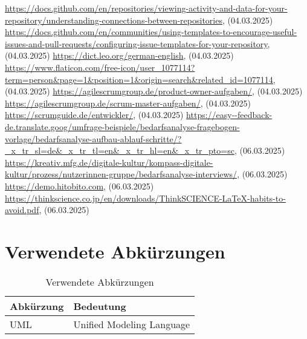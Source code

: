 \renewcommand\bibname{Quellenverzeichnis}
\begin{thebibliography}{9}
     \url{https://docs.github.com/en/repositories/viewing-activity-and-data-for-your-repository/understanding-connections-between-repositories}, (04.03.2025)
     \url{https://docs.github.com/en/communities/using-templates-to-encourage-useful-issues-and-pull-requests/configuring-issue-templates-for-your-repository}, (04.03.2025)
     \url{https://dict.leo.org/german-english}, (04.03.2025)
     \url{https://www.flaticon.com/free-icon/user_1077114?term=person&page=1&position=1&origin=search&related_id=1077114}, (04.03.2025)
     \url{https://agilescrumgroup.de/product-owner-aufgaben/}, (04.03.2025)
     \url{https://agilescrumgroup.de/scrum-master-aufgaben/}, (04.03.2025)
     \url{https://scrumguide.de/entwickler/}, (04.03.2025)
     \url{https://easy--feedback-de.translate.goog/umfrage-beispiele/bedarfsanalyse-fragebogen-vorlage/bedarfsanalyse-aufbau-ablauf-schritte/?_x_tr_sl=de&_x_tr_tl=en&_x_tr_hl=en&_x_tr_pto=sc}, (06.03.2025)
     \url{https://kreativ.mfg.de/digitale-kultur/kompass-digitale-kultur/prozess/nutzerinnen-gruppe/bedarfsanalyse-interviews/}, (06.03.2025)
     \url{https://demo.hitobito.com}, (06.03.2025)
     \url{https://thinkscience.co.jp/en/downloads/ThinkSCIENCE-LaTeX-habits-to-avoid.pdf}, (06.03.2025)
    
\end{thebibliography}

\chapter{Verwendete Abkürzungen}

\begin{table}[H]
    \begin{tabular}{|L{0.3\textwidth}|L{0.6\textwidth}|}
        \hline
         \textbf{\color{white}Abkürzung} & \textbf{\color{white}Bedeutung} \\[12pt]
        \hline
        UML & Unified Modeling Language \\
        \hline
    \end{tabular}
    \caption{Verwendete Abkürzungen}
\end{table}

